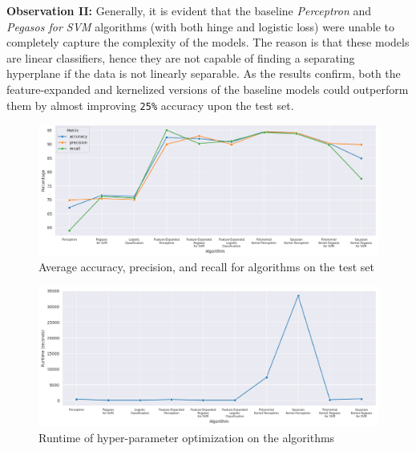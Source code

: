 {\bf Observation II:} Generally, it is evident that the baseline \textit{Perceptron} and \textit{Pegasos for SVM} algorithms (with both hinge and logistic loss) were unable to completely capture the complexity of the models. The reason is that these models are linear classifiers, hence they are not capable of finding a separating hyperplane if the data is not linearly separable. As the results confirm, both the feature-expanded and kernelized versions of the baseline models could outperform them by almost improving \texttt{25\%} accuracy upon the test set. 

\begin{figure}[ht]
    \centering
    \includegraphics[width=\linewidth]{images/performance.png}
    \caption{Average accuracy, precision, and recall for algorithms on the test set}
    \label{fig:performance}
\end{figure} \vspace{10pt}

\begin{figure}[ht]
    \centering
    \includegraphics[width=\linewidth]{images/runtime.png}
    \caption{Runtime of hyper-parameter optimization on the algorithms}
    \label{fig:runtime}
\end{figure} \vspace{10pt}

